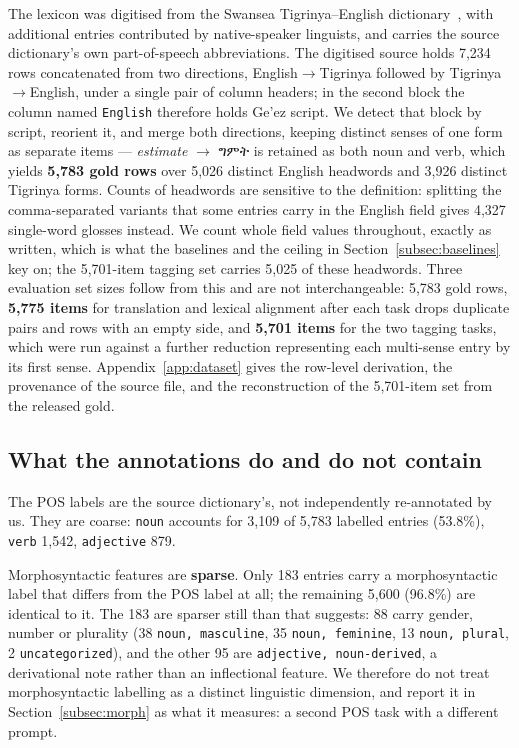 \documentclass[11pt]{article}
\newcommand{\ti}[1]{{\geezfont #1}}
\newcommand{\ti}[1]{\texttt{[ge'ez]}}
\begin{document}
The lexicon was digitised from the Swansea Tigrinya--English
dictionary~\citep{swansea-dictionary}, with additional entries contributed by
native-speaker linguists, and carries the source dictionary's own
part-of-speech abbreviations. The digitised source holds 7,234 rows
concatenated from two directions, English$\rightarrow$Tigrinya followed by
Tigrinya$\rightarrow$English, under a single pair of column headers; in the
second block the column named \texttt{English} therefore holds Ge'ez script.
We detect that block by script, reorient it, and merge both directions,
keeping distinct senses of one form as separate items --- \emph{estimate}
$\rightarrow$ \ti{ግምት} is retained as both noun and verb, which yields
\textbf{5,783 gold rows} over 5,026 distinct English headwords and 3,926
distinct Tigrinya forms. Counts of headwords are sensitive to the
definition: splitting the comma-separated variants that some entries carry
in the English field gives 4,327 single-word glosses instead. We count whole
field values throughout, exactly as written, which is what the baselines and
the ceiling in Section~\ref{subsec:baselines} key on; the 5,701-item tagging
set carries 5,025 of these headwords. Three evaluation set sizes follow
from this and are not
interchangeable: 5,783 gold rows, \textbf{5,775 items} for translation and
lexical alignment after each task drops duplicate pairs and rows with an
empty side, and \textbf{5,701 items} for the two tagging tasks, which were
run against a further reduction representing each multi-sense entry by its
first sense. Appendix~\ref{app:dataset} gives the row-level derivation, the
provenance of the source file, and the reconstruction of the 5,701-item set
from the released gold.

\subsection{What the annotations do and do not contain}
\label{subsec:annotations}

The POS labels are the source dictionary's, not independently re-annotated by
us. They are coarse: \texttt{noun} accounts for 3,109 of 5,783 labelled
entries (53.8\%), \texttt{verb} 1,542, \texttt{adjective} 879.

Morphosyntactic features are \textbf{sparse}. Only 183 entries carry a
morphosyntactic label that differs from the POS label at all; the remaining
5,600 (96.8\%) are identical to it. The 183 are sparser still than that
suggests: 88 carry gender, number or plurality (38 \texttt{noun,
masculine}, 35 \texttt{noun, feminine}, 13 \texttt{noun, plural}, 2
\texttt{uncategorized}), and the other 95 are \texttt{adjective,
noun-derived}, a derivational note rather than an inflectional feature. We therefore do not treat morphosyntactic labelling as a
distinct linguistic dimension, and report it in Section~\ref{subsec:morph} as
what it measures: a second POS task with a different prompt.
\end{document}
